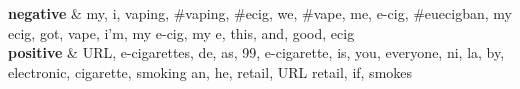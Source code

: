 {\bf negative} & my, i, vaping, \#vaping, \#ecig, we, \#vape, me, e-cig, \#euecigban, my ecig, got, vape, i'm, my e-cig, my e, this, and, good, ecig\\
\hline
{\bf positive} & URL, e-cigarettes, de, as, 99, e-cigarette, is, you, everyone, ni, la, by, electronic, cigarette, smoking an, he, retail, URL retail, if, smokes\\
\hline

